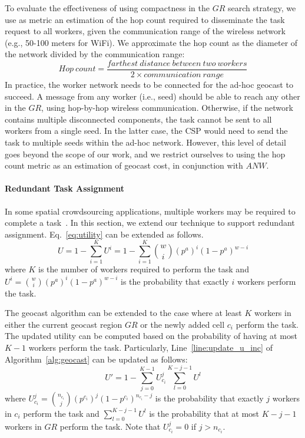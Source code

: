 \documentclass{USC-Thesis}
\numberwithin{equation}{chapter}
\begin{document}
To evaluate the effectiveness of using compactness in the $\mathit{GR}$ search strategy, we use as metric an estimation of the hop count required to disseminate the task request to all workers, given the communication range of the wireless network (e.g., 50-100 meters for WiFi). We approximate the hop count as the diameter of the network divided by the communication range:
\begin{equation}
\label{eq:hops_count}
	\mathit{Hop\ count} = \displaystyle \frac{\mathit{farthest\ distance\ between\ two\ workers}}{2\times\mathit{communication\ range}}
\end{equation}
In practice, the worker network needs to be connected for the ad-hoc geocast to succeed. A message from any worker (i.e., seed) should be able to reach any other in the $\mathit{GR}$, using hop-by-hop wireless communication. Otherwise, if the network contains multiple disconnected components, the task cannot be sent to all workers from a single seed. In the latter case, the CSP would need to send the task to multiple seeds within the ad-hoc network. However, this level of detail goes beyond the scope of our work, and we restrict ourselves to using the hop count metric as an estimation of geocast cost, in conjunction with $\mathit{ANW}$.


\paragraph{Redundant Task Assignment}
\label{sec:redundant}
In some spatial crowdsourcing applications, multiple workers may be required to complete a task~\cite{kazemi2013geotrucrowd}. In this section, we extend our technique to support redundant assignment.
Eq.~\eqref{eq:utility} can be extended as follows.
\begin{equation}
\label{eq:utility_r}
U = 1-\sum_{i=1}^{K}U^i = 1-\sum_{i=1}^{K}\binom{w}{i}(p^a)^i(1-p^a)^{w-i}
\end{equation} 
where $K$ is the number of workers required to perform the task and $U^i=\binom{w}{i}(p^a)^i(1-p^a)^{w-i}$ is the probability that exactly $i$ workers perform the task.

The geocast algorithm can be extended to the case where at least $K$ workers in either the current geocast region $\mathit{GR}$ or the newly added cell $c_i$ perform the task. The updated utility can be computed based on the probability of having at most $K-1$ workers perform the task. Particularly, Line~\ref{line:update_u_inc} of Algorithm~\ref{alg:geocast} can be updated as follows:
\begin{equation}
\label{eq:update_u_r}
U' = 1-\sum_{j=0}^{K-1}U_{c_i}^j\sum_{l=0}^{K-j-1}U^l
\end{equation}
where $U_{c_i}^j=\binom{n_{c_i}}{j}(p^{c_i})^j(1-p^{c_i})^{n_{c_i}-j}$ is the probability that exactly $j$ workers in $c_i$ perform the task and $\sum_{l=0}^{K-j-1}U^l$ is the probability that at most $K-j-1$ workers in $\mathit{GR}$ perform the task. Note that $U_{c_i}^j=0$ if $j>n_{c_i}$.
\end{document}
